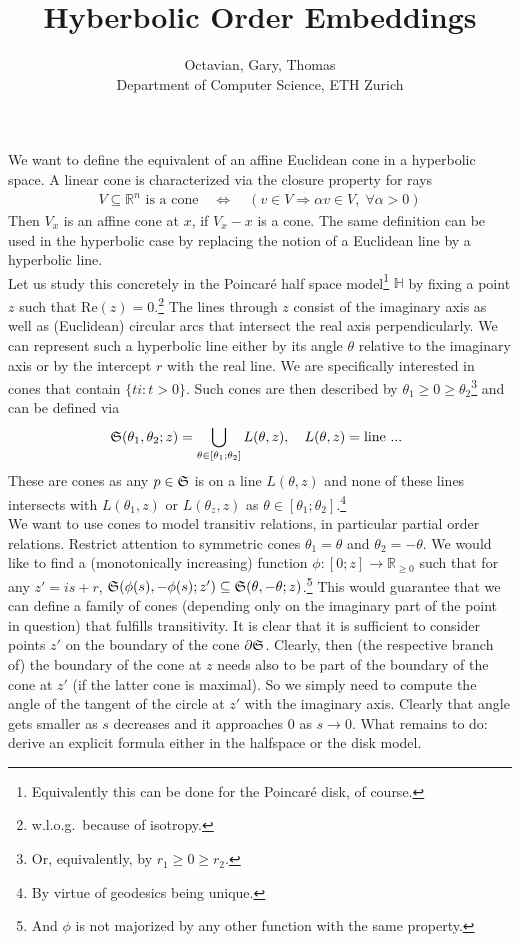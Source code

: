 \documentclass{article}
\title{Hyberbolic Order Embeddings}
\author{Octavian, Gary, Thomas \\[2mm] Department of Computer Science, ETH Zurich}
\renewcommand{\Re}{{\mathbb R}}
\begin{document}
\maketitle

We want to define the equivalent of an affine Euclidean cone in a hyperbolic space. A linear cone is characterized via the closure property for rays
\begin{align}
V \subseteq \Re^n \text{ is a cone}  \quad \iff \quad  (v \in V \Longrightarrow \alpha v \in V, \; \forall \alpha >0)
\end{align}
Then $V_x$ is an affine cone at $x$, if $V_x -x$ is a cone. The same definition can be used in the hyperbolic case by replacing the notion of a Euclidean line by a hyperbolic line. \\

Let us study this concretely in the Poincar\'e half space model\footnote{Equivalently this can be done for the Poincar\'e disk, of course.} $\mathbb H$  by fixing a point $z$ such that $\text{Re}(z)=0.$\footnote{w.l.o.g.~because of isotropy.}  The lines through $z$ consist of the imaginary axis as well as (Euclidean) circular arcs that intersect the real axis perpendicularly. We can represent such a hyperbolic line either by its angle $\theta$ relative to the imaginary axis or by the intercept $r$ with the real line. We are specifically interested in cones that contain $\{ti: t>0\}$. Such cones are then described by $\theta_1 \geq 0 \geq \theta_2$\footnote{Or, equivalently, by $r_1 \geq 0 \geq r_2$.} and can be defined via
\begin{align}
\frak S(\theta_1,\theta_2;z) = \bigcup_{\theta \in [\theta_1; \theta_2]} L(\theta,z), \quad L(\theta,z) = \text{line ... }
\end{align}
These are cones as any $p \in \frak S$ is on a line $L(\theta,z)$ and none of these lines intersects with $L(\theta_1,z)$ or $L(\theta_z,z)$ as $\theta \in [\theta_1; \theta_2]$.\footnote{By virtue of geodesics being unique.}\\

We want to use cones to model transitiv relations, in particular partial order relations.  Restrict attention to symmetric cones $\theta_1 = \theta$ and $\theta_2 = -\theta$. We would like to find a (monotonically increasing) function $\phi: [0; z] \to \Re_{\geq 0}$ such that for any $z' = is + r$, $\frak S(\phi(s), -\phi(s); z') \subseteq \frak S(\theta, -\theta; z)$.\footnote{And $\phi$ is not majorized by any other function with the same property.} This would guarantee that we can define a family of cones (depending only on the imaginary part of the point in question) that fulfills transitivity. It is clear that it is sufficient to consider points $z'$ on the boundary of the cone $\partial \frak S$. Clearly, then (the respective branch of) the boundary of the cone at $z$ needs also to be part of the boundary of the cone at $z'$ (if the latter cone is maximal). So we simply need to compute the angle of the tangent of the circle at $z'$ with the imaginary axis. Clearly that angle gets smaller as $s$ decreases and it approaches $0$ as $s \to 0$. What remains to do: derive an explicit formula either in the halfspace or the disk model. 
\end{document}
